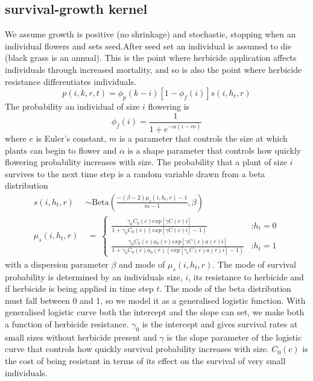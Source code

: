 \documentclass[12pt, a4paper]{article}
\begin{document}
\subsection*{survival-growth kernel}
We assume growth is positive (no shrinkage) and stochastic, stopping when an individual flowers and sets seed.After seed set an individual is assumed to die (black grass is an annual). This is the point where herbicide application affects individuals through increased mortality, and so is also the point where herbicide resistance differentiates individuals.  
\begin{equation} \label{eq:sur_grow_all}
	p(i, k, r, t) = \phi_p(k - i)[1 - \phi_f(i)]s(i, h_t, r) 
\end{equation}  
The probability an individual of size $i$ flowering is 
\begin{equation}\label{eq:flower_prob}
	\phi_f(i) = \frac{1}{1+e^{-\alpha(i - m)}} 
\end{equation}
where $e$ is Euler's constant, $m$ is a parameter that controls the size at which plants can begin to flower and $\alpha$ is a shape parameter that controls how quickly flowering probability increases with size. The probability that a plant of size $i$ survives to the next time step is a random variable drawn from a beta distribution 
\begin{subequations}
\label{eq:survival}
\begin{align}
	\label{eq:surv_beta}
	 s(i, h_t, r) &\sim \text{Beta}\left(\frac{-(\beta - 2)\mu_s(i, h_t, r) - 1}{m - 1}, \beta \right)\\
	\label{eq:surv_mode}
	\mu_s(i, h_t, r) &~=~ 	\begin{cases}
		\frac{\gamma_0 C_0(c) exp[\gamma C(c) i]}{1 + \gamma_0 C_0(c)(exp[\gamma C(c) i] - 1)} &\text{:} h_t = 0 \\
		\frac{\gamma_0 C_0(c) a_0(r) exp[\gamma C(c) a(r) i]}{1 + \gamma_0 C_0(c) a_0(r) (exp[\gamma_r C(c) a(r) i] - 1)} &\text{:} h_t = 1
	\end{cases}	 
\end{align}
\end{subequations}
with a dispersion parameter $\beta$ and mode of $\mu_s(i, h_t, r)$. The mode of survival probability is determined by an individuals size, $i$, its resistance to herbicide and if herbicide is being applied in time step $t$. The mode of the beta distribution must fall between 0 and 1, so we model it as a generalised logistic function. With generalised logistic curve both the intercept and the slope can set, we make both a function of herbicide resistance. $\gamma_0$ is the intercept and gives survival rates at small sizes without herbicide present and $\gamma$ is the slope parameter of the logistic curve that controls how quickly survival probability increases with size. $C_0(c)$ is the cost of being resistant in terms of its effect on the survival of very small individuals.    
\end{document}
